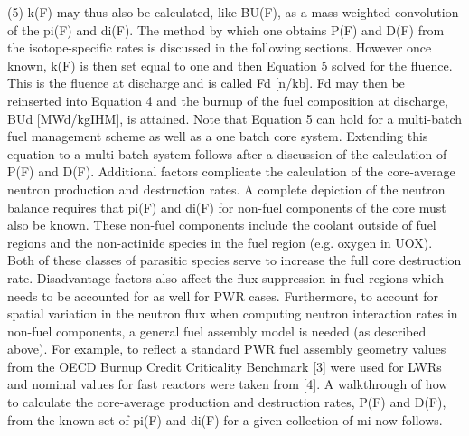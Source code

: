                                                   (5)
k(F) may thus also be calculated, like BU(F), as a mass-weighted convolution of the pi(F) and di(F).  The method by which one obtains P(F) and D(F) from the isotope-specific rates is discussed in the following sections.  However once known, k(F) is then set equal to one and then Equation 5 solved for the fluence.  This is the fluence at discharge and is called Fd [n/kb].  Fd may then be reinserted into Equation 4 and the burnup of the fuel composition at discharge, BUd [MWd/kgIHM], is attained.
Note that Equation 5 can hold for a multi-batch fuel management scheme as well as a one batch core system.  Extending this equation to a multi-batch system follows after a discussion of the calculation of P(F) and D(F).
Additional factors complicate the calculation of the core-average neutron production and destruction rates.  A complete depiction of the neutron balance requires that pi(F) and di(F) for non-fuel components of the core must also be known.  These non-fuel components include the coolant outside of fuel regions and the non-actinide species in the fuel region (e.g. oxygen in UOX).  Both of these classes of parasitic species serve to increase the full core destruction rate.  Disadvantage factors also affect the flux suppression in fuel regions which needs to be accounted for as well for PWR cases.  Furthermore, to account for spatial variation in the neutron flux when computing neutron interaction rates in non-fuel components, a general fuel assembly model is needed (as described above).  For example, to reflect a standard PWR fuel assembly geometry values from the OECD Burnup Credit Criticality Benchmark [3] were used for LWRs and nominal values for fast reactors were taken from [4].  A walkthrough of how to calculate the core-average production and destruction rates, P(F) and D(F), from the known set of pi(F) and di(F) for a given collection of mi now follows.  



